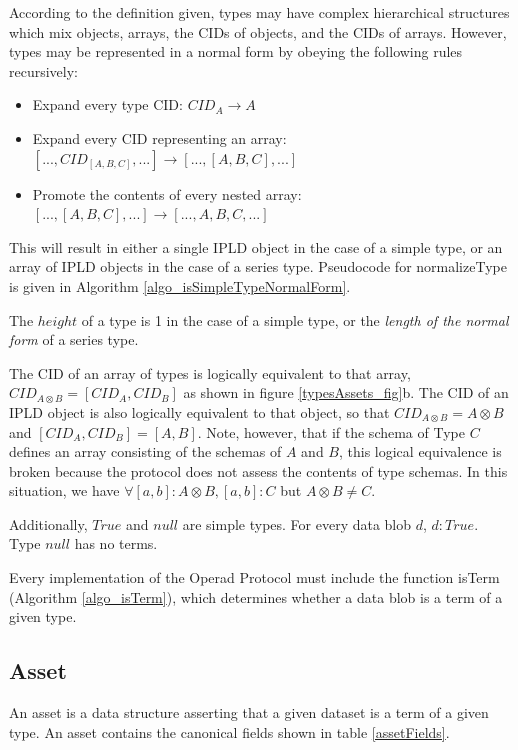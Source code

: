 \documentclass[9pt, oneside]{article}   	%
\begin{document}
According to the definition given, types may have complex hierarchical structures which mix objects, arrays, the CIDs of objects, and the CIDs of arrays. However, types may be represented in a normal form by obeying the following rules recursively:

\begin{itemize}
\item Expand every type CID: $CID_A \rightarrow A$
\item Expand every CID representing an array: $[..., CID_{[A,B,C]}, ...] \rightarrow [..., [A,B,C], ...]$
\item Promote the contents of every nested array: $ [..., [A,B,C], ...] \rightarrow [..., A,B,C, ...]$
\end{itemize}

This will result in either a single IPLD object in the case of a simple type, or an array of IPLD objects in the case of a series type. Pseudocode for normalizeType is given in Algorithm \ref{algo_isSimpleTypeNormalForm}.

The $height$ of a type is 1 in the case of a simple type, or the \textit{length of the normal form} of a series type.

The CID of an array of types is logically equivalent to that array, $CID_{A \otimes B} = [CID_A, CID_B]$ as shown in figure \ref{typesAssets_fig}b. The CID of an IPLD object is also logically equivalent to that object, so that $CID_{A \otimes B} = A \otimes B$ and $[CID_A, CID_B] = [A,B]$. Note, however, that  if the schema of Type $C$ defines an array consisting of the schemas of $A$ and $B$, this logical equivalence is broken because the protocol does not assess the contents of type schemas. In this situation, we have $\forall [a,b] : A\otimes B,  [a,b] : C$ but $ A\otimes B \neq C$.

Additionally, $True$ and $null$ are simple types. For every data blob $d$, $d : True$. Type $null$ has no terms.

Every implementation of the Operad Protocol must include the function isTerm (Algorithm \ref{algo_isTerm}), which determines whether a data blob is a term of a given type.

\subsection{Asset}\label{asset}

An asset is a data structure asserting that a given dataset is a term of a given type. An asset contains the canonical fields shown in table \ref{assetFields}.
\end{document}
